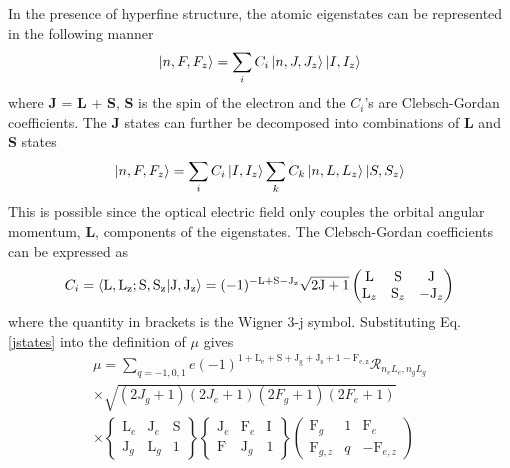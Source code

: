 In the presence of hyperfine structure, the atomic eigenstates can be represented in the following manner
\begin{equation}
\ket{n,F,F_z} = \sum_iC_i\ket{n,J,J_z}\ket{I,I_z}
\label{jstates}
\end{equation}
where \textbf{J}  =\textbf{ L} + \textbf{S}, \textbf{S} is the spin of the electron and the $C_i$'s are Clebsch-Gordan coefficients. The \textbf{J} states can further be decomposed into combinations of \textbf{L} and \textbf{S} states
\begin{equation}
\ket{n,F,F_z} = \sum_iC_i\ket{I,I_z}\sum_kC_k\ket{n,L,L_z}\ket{S,S_z}
\label{jstates}
\end{equation}
This is possible since the optical electric field only couples the orbital angular momentum, \textbf{L}, components of the eigenstates.  The Clebsch-Gordan coefficients can be expressed as
\begin{equation}
C_i = \braket{\mathrm{L,L_z ; S,S_z}|\mathrm{J,J_z}}=(-1)^{\mathrm{-L+S-J_z}}\sqrt{\mathrm{2J+1}}
\left(
\begin{matrix}
\mathrm{L} & \mathrm{S} & \mathrm{J}\\
\mathrm{L}_z & \mathrm{S}_z & -\mathrm{J}_z
\end{matrix}
\right)
\end{equation}
where the quantity in brackets is the Wigner 3-j symbol.
Substituting Eq. \ref{jstates} into the definition of $\mu$ gives 
\begin{equation}
\begin{split}
\mu = \sum_{q = -1,0,1} e (-1)^{\mathrm{1+L_e+S+J_g+J_s+1-F_{e,z}}}\mathcal{R}_{n_e L_e, n_g L_g}\\
\times \sqrt{(2J_g+1)(2J_e+1)(2F_g+1)(2F_e+1)}\\
\times \left\lbrace
\begin{matrix}
\mathrm{L}_e & \mathrm{J}_e & \mathrm{S}\\
\mathrm{J}_g & \mathrm{L}_g & 1
\end{matrix}
\right\rbrace
\left\lbrace
\begin{matrix}
\mathrm{J}_e & \mathrm{F}_e & \mathrm{I}\\
\mathrm{F} & \mathrm{J}_g &1
\end{matrix}
\right\rbrace
\left(
\begin{matrix}
\mathrm{F}_g & 1 & \mathrm{F}_e\\
\mathrm{F}_{g,z} & q &-\mathrm{F}_{e,z}
\end{matrix}
\right)
\end{split}
\end{equation}
